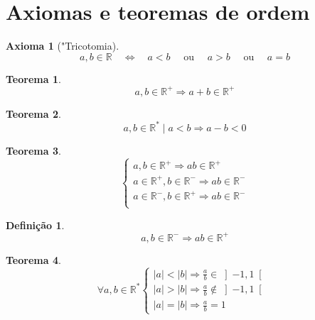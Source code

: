 \documentclass[
]{book}
\newtheorem{theorem}{Teorema}[chapter]
\newtheorem{proposition}{Axioma}[chapter]
\theoremstyle{definition}
\newtheorem{definition}{Definição}[chapter]
\theoremstyle{definition}
\theoremstyle{definition}
\theoremstyle{definition}
\theoremstyle{remark}
\begin{document}
\section{Axiomas e teoremas de ordem}\label{axiomas-e-teoremas-de-ordem}

\begin{proposition}["Tricotomia]
\protect\hypertarget{prp:irtricotomia}{}\label{prp:irtricotomia}\[
a,b \in \mathbb{R} \quad  \Leftrightarrow \quad  a < b \quad \text{ ou } \quad a > b \quad \text{ ou } \quad  a = b
\]
\end{proposition}

\begin{theorem}
\protect\hypertarget{thm:thmordsum}{}\label{thm:thmordsum}\[
a, b \in \mathbb{R}^+ \Rightarrow a + b \in \mathbb{R}^+
\]
\end{theorem}

\begin{theorem}
\protect\hypertarget{thm:thmordsubrt}{}\label{thm:thmordsubrt}\[
a, b \in \mathbb{R}^* \mid a < b \Rightarrow a-b<0
\]
\end{theorem}

\begin{theorem}
\protect\hypertarget{thm:thmordmult}{}\label{thm:thmordmult}\[
\left\{\begin{matrix}
a,b \in \mathbb{R}^+ \Rightarrow ab \in \mathbb{R}^+ \\
a \in \mathbb{R}^+, b \in \mathbb{R}^- \Rightarrow ab \in \mathbb{R}^- \\
a \in \mathbb{R}^-, b \in \mathbb{R}^+ \Rightarrow ab \in \mathbb{R}^- \\
\end{matrix}\right.
\]
\end{theorem}

\begin{definition}
\protect\hypertarget{def:defordmult}{}\label{def:defordmult}\[
a,b \in \mathbb{R}^- \Rightarrow ab \in \mathbb{R}^+ 
\]
\end{definition}

\begin{theorem}
\protect\hypertarget{thm:thmorddiv}{}\label{thm:thmorddiv}\[
\forall a,b \in \mathbb{R}^* 
\left\{\begin{matrix}
|a| < |b| \Rightarrow \frac{a}{b} \in \left]-1,1 \right[\ \\
|a| > |b| \Rightarrow \frac{a}{b} \notin \left]-1,1 \right[\ \\
|a| = |b| \Rightarrow \frac{a}{b} = 1
\end{matrix}\right.
\]
\end{theorem}
\end{document}
